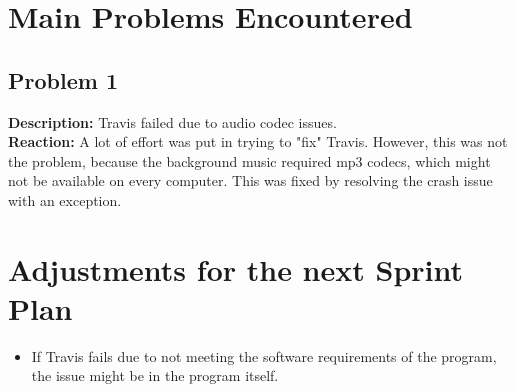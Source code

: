 \documentclass[10pt]{article}
\begin{document}
\section*{Main Problems Encountered}
\subsection*{Problem 1}
\textbf{Description:}
Travis failed due to audio codec issues.\\
\textbf{Reaction:} 
A lot of effort was put in trying to "fix" Travis. However, this was not the problem, because the background music required mp3 codecs, which might not be available on every computer. This was fixed by resolving the crash issue with an exception.

\section*{Adjustments for the next Sprint Plan}
\begin{itemize}
\item If Travis fails due to not meeting the software requirements of the program, the issue might be in the program itself.
\end{itemize}
\end{document}

